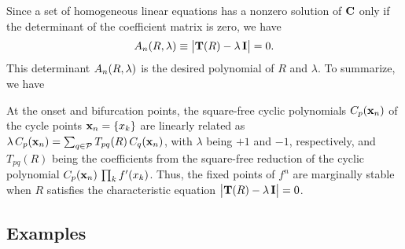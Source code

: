 \documentclass{ws-ijbc}
\begin{document}
Since a set of homogeneous linear equations
  has a nonzero solution of $\mathbf{C}$
  only if the determinant of the coefficient matrix
  is zero, we have
\begin{equation}
  A_n(R, \lambda) \equiv \big| \mathbf{T}(R) - \lambda \, \mathbf{I} \big| = 0.
\label{eq:xr}
\end{equation}
%
This determinant $A_n(R, \lambda)$
  is the desired polynomial of $R$ and $\lambda$.
%
%
To summarize, we have
\begin{theorem}
  At the onset and bifurcation points,
  the square-free cyclic polynomials $C_p(\mathbf{x}_{n})$
  of the cycle points $\mathbf{x}_{n} = \{x_k\}$
  are linearly related as
  $\lambda \, C_p(\mathbf{x}_{n}) = \sum_{q \in \mathcal P} T_{pq}(R) \, C_q(\mathbf{x}_{n})$,
  with $\lambda$ being $+1$ and $-1$, respectively,
  and $T_{pq}(R)$ being the coefficients
  from the square-free reduction of the cyclic polynomial
  $C_p(\mathbf{x}_{n}) \, \prod_k f'(x_k)$. %
  Thus, the fixed points of $f^n$
  are marginally stable when $R$ satisfies
  the characteristic equation
  $\big| \mathbf{T}(R) - \lambda \, \mathbf{I} \big| = 0$.
  \label{thm:main}
\end{theorem}






\subsection{\label{sec:examples}Examples}
\end{document}
